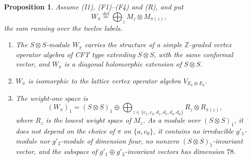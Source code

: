 \documentclass[leqno]{article}
\newcommand{\Z}{\ensuremath{\mathbb{Z}}}
\newcommand{\ot}{\otimes}
\newcommand{\ov}{\overset}
\newtheorem{prop}[thm]{Proposition}
\numberwithin{equation}{section}
\begin{document}
\begin{prop}
\label{prop:W-pi}
Assume \textup{(I1)}, \textup{(F1)}--\textup{(F4)} and \textup{(R)}, and put
\[
W_\pi \ov{\mathrm{def}}{=} \bigoplus_{z} M_z \ot M_{\pi(z)},
\]
the sum running over the twelve labels.
\begin{enumerate}
\item The $S \ot S$-module $W_\pi$ carries the structure of a simple $\Z$-graded vertex operator algebra of CFT type extending $S \ot S$, with the same conformal vector, and $W_\pi$ is a diagonal holomorphic extension of $S \ot S$.
\item $W_\pi$ is isomorphic to the lattice vertex operator algebra $V_{E_8 \oplus E_8}$.
\item The weight-one space is
\[
(W_\pi)_1 = (S \ot S)_1 \oplus \bigoplus_{z \in \{c_1,c_2,d_1,d_5,d_4,d_6\}} R_z \ot R_{\pi(z)},
\]
where $R_z$ is the lowest weight space of $M_z$. As a module over $(S \ot S)_1$, it does not depend on the choice of $\pi$ on $\{a,c_0\}$, it contains no irreducible $g'_1$-module nor $g'_2$-module of dimension four, no nonzero $(S \ot S)_1$-invariant vector, and the subspace of $g'_1 \oplus g'_2$-invariant vectors has dimension $78$.
\end{enumerate}
\end{prop}
\end{document}

